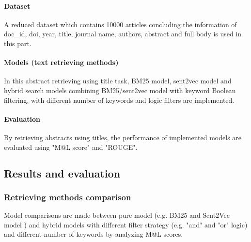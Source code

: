 \paragraph{Dataset}
A reduced dataset which contains 10000 articles concluding the information of doc\_id, doi, year, title, journal name, authors, abstract and full body is used in this part.

\paragraph{Models (text retrieving methods)}
In this abstract retrieving using title task, 
BM25 model, sent2vec model and hybrid search models combining BM25/sent2vec model with keyword Boolean filtering, with different number of keywords and logic filters are implemented.

\paragraph{Evaluation}
By retrieving abstracts using titles, the performance of implemented models are evaluated using "M@L score" and "ROUGE".

\subsection{Results and evaluation}
\subsubsection{Retrieving methods comparison}

Model comparisons are made between pure model (e.g. BM25 and Sent2Vec model ) and hybrid models with different filter strategy (e.g. "and" and "or" logic) and different number of keywords by analyzing M@L scores.

